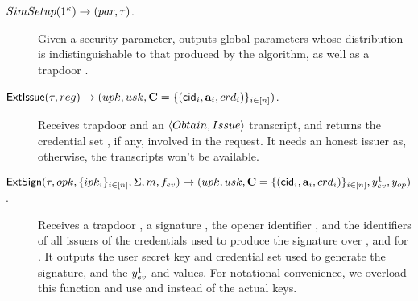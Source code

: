 \begin{description}
\item[$SimSetup(1^\kappa) \rightarrow (par,\tau)$.] Given a security
  parameter, outputs global parameters \parm whose distribution is
  indistinguishable to that produced by the \Setup algorithm, as well as a
  trapdoor \trap.
\item[$\mathsf{ExtIssue}(\tau,reg) \rightarrow (upk,usk,\mathbf{C}=
  \lbrace(\mathsf{cid}_i,\mathbf{a}_i,crd_i) \rbrace_{i \in [n]})$.]
  Receives trapdoor \trap and an $\langle Obtain, Issue \rangle$ transcript,
  and returns the credential set \sCred, if any, involved in the request. It
  needs an honest issuer as, otherwise, the transcripts won't be available. 
\item[$\mathsf{ExtSign}(\tau,opk,\lbrace ipk_i \rbrace_{i \in [n]},\Sigma,m,
  f_{ev}) \rightarrow (upk,usk,\mathbf{C}=\lbrace(\mathsf{cid}_i,\mathbf{a}_i,crd_i)
  \rbrace_{i \in [n]},y_{ev}^1,y_{op})$.] Receives a trapdoor \trap, a signature
  \Sig, the opener identifier \oid, and the identifiers of all
  issuers of the credentials used to produce the signature over \msg, and for
  \feval. It outputs the user secret key and credential set \sCred used to
  generate the signature, and the $y_{ev}^1$ and \yinsp values. For notational
  convenience, we overload this function and use \oid and \iid instead of the
  actual keys.


\end{description}

